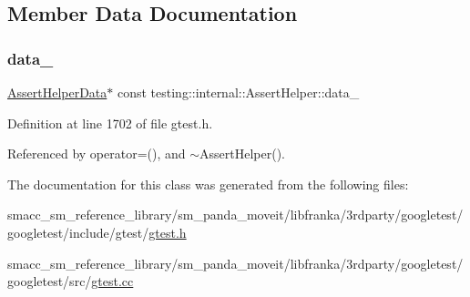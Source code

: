 \subsection{Member Data Documentation}
\mbox{\label{classtesting_1_1internal_1_1AssertHelper_af69a4d66a929d0c6e419f4efd3ba6b3a}} 
\subsubsection{\texorpdfstring{data\+\_\+}{data\_}}
{\footnotesize\ttfamily \hyperlink{structtesting_1_1internal_1_1AssertHelper_1_1AssertHelperData}{Assert\+Helper\+Data}$\ast$ const testing\+::internal\+::\+Assert\+Helper\+::data\+\_\+\hspace{0.3cm}{\ttfamily [private]}}



Definition at line 1702 of file gtest.\+h.



Referenced by operator=(), and $\sim$\+Assert\+Helper().



The documentation for this class was generated from the following files\+:\begin{DoxyCompactItemize}
\item 
smacc\+\_\+sm\+\_\+reference\+\_\+library/sm\+\_\+panda\+\_\+moveit/libfranka/3rdparty/googletest/googletest/include/gtest/\hyperlink{gtest_8h}{gtest.\+h}\item 
smacc\+\_\+sm\+\_\+reference\+\_\+library/sm\+\_\+panda\+\_\+moveit/libfranka/3rdparty/googletest/googletest/src/\hyperlink{gtest_8cc}{gtest.\+cc}\end{DoxyCompactItemize}
